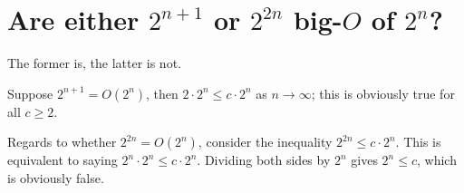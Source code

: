 \section[Problem 4]{Are either $2^{n + 1}$ or $2^{2n}$ big-$O$ of $2^n$?}

The former is, the latter is not. 

Suppose $2^{n + 1} = O(2^n)$, then $2 \cdot 2^n \leq c \cdot 2^n$ as $n \rightarrow \infty$; this is obviously true for all $c \geq 2$. 

Regards to whether $2^{2n} = O(2^n)$, consider the inequality $2^{2n} \leq c \cdot 2^n$. This is equivalent to saying $2^n \cdot 2^n \leq c \cdot 2^n$. Dividing both sides by $2^n$ gives $2^n \leq c$, which is obviously false.
